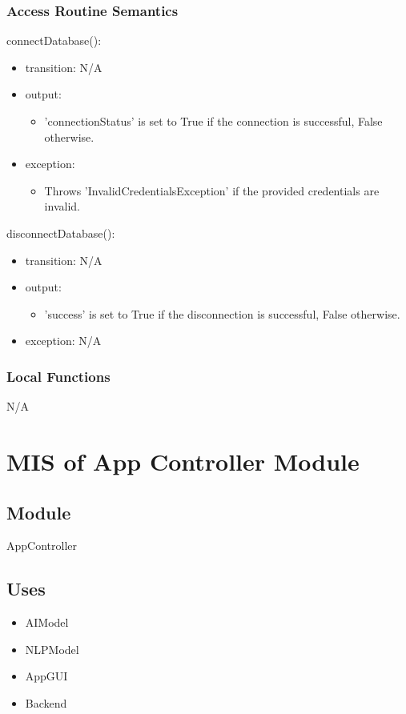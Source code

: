 \documentclass[12pt, titlepage]{article}
\begin{document}
\subsubsection{Access Routine Semantics}

\noindent connectDatabase():
\begin{itemize}
\item transition: N/A 
\item output: \begin{itemize}
    \item 'connectionStatus' is set to True if the connection is successful, False otherwise.
\end{itemize}
\item exception: \begin{itemize}
    \item Throws 'InvalidCredentialsException' if the provided credentials are invalid.
\end{itemize}
\end{itemize}

\noindent disconnectDatabase():
\begin{itemize}
\item transition: N/A 
\item output: \begin{itemize}
    \item 'success' is set to True if the disconnection is successful, False otherwise.
\end{itemize} 
\item exception: N/A 
\end{itemize}

\subsubsection{Local Functions}
N/A
\newpage

\section{MIS of App Controller Module} \label{Module} 
\subsection{Module}
AppController
\subsection{Uses}
\begin{itemize}
    \item AIModel
    \item NLPModel
    \item AppGUI
    \item Backend
\end{itemize}
\end{document}
